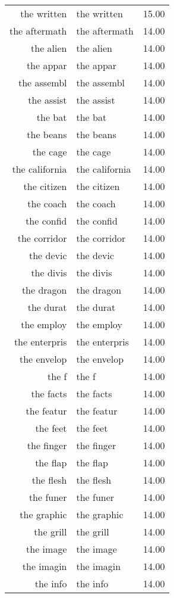 \begin{table}[ht]
\begin{tabular}{rlr}
  the written & the written & 15.00 \\ 
  the aftermath & the aftermath & 14.00 \\ 
  the alien & the alien & 14.00 \\ 
  the appar & the appar & 14.00 \\ 
  the assembl & the assembl & 14.00 \\ 
  the assist & the assist & 14.00 \\ 
  the bat & the bat & 14.00 \\ 
  the beans & the beans & 14.00 \\ 
  the cage & the cage & 14.00 \\ 
  the california & the california & 14.00 \\ 
  the citizen & the citizen & 14.00 \\ 
  the coach & the coach & 14.00 \\ 
  the confid & the confid & 14.00 \\ 
  the corridor & the corridor & 14.00 \\ 
  the devic & the devic & 14.00 \\ 
  the divis & the divis & 14.00 \\ 
  the dragon & the dragon & 14.00 \\ 
  the durat & the durat & 14.00 \\ 
  the employ & the employ & 14.00 \\ 
  the enterpris & the enterpris & 14.00 \\ 
  the envelop & the envelop & 14.00 \\ 
  the f & the f & 14.00 \\ 
  the facts & the facts & 14.00 \\ 
  the featur & the featur & 14.00 \\ 
  the feet & the feet & 14.00 \\ 
  the finger & the finger & 14.00 \\ 
  the flap & the flap & 14.00 \\ 
  the flesh & the flesh & 14.00 \\ 
  the funer & the funer & 14.00 \\ 
  the graphic & the graphic & 14.00 \\ 
  the grill & the grill & 14.00 \\ 
  the image & the image & 14.00 \\ 
  the imagin & the imagin & 14.00 \\ 
  the info & the info & 14.00 \\ 

\end{tabular}
\end{table}
